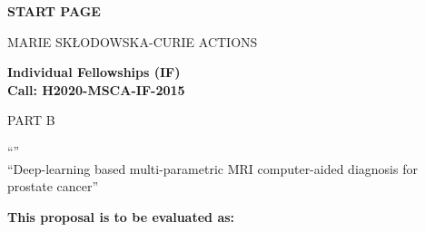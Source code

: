 \phantom{a}
\vspace{15mm}
\begin{center}


        \Large{


        \textbf{START PAGE}

          \vspace{15mm}
          MARIE SK\L{}ODOWSKA-CURIE ACTIONS\\
          \vspace{1cm}

          \textbf{Individual Fellowships (IF)}\\
          \textbf{Call: H2020-MSCA-IF-2015}
          \vspace{2cm}

          PART B
          \vspace{2.5cm}

          ``\proposalAcronym''\\
          \vspace{1cm}
          ``Deep-learning based multi-parametric MRI computer-aided diagnosis for prostate cancer''
          \vspace{1cm}

          \textbf{This proposal is to be evaluated as:}
          \vspace{.5cm}

          \textbf{\evaluationPannel}
        }

  \end{center}
\vspace{1cm}

